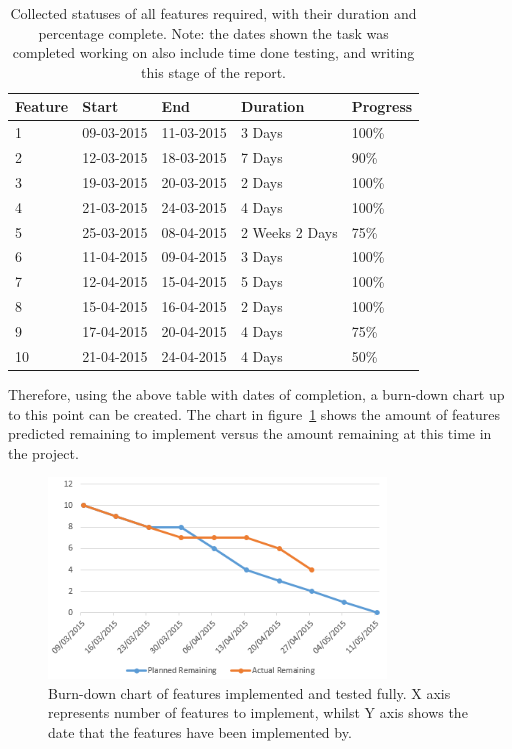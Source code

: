 \begin{table}[h]
\centering
\begin{tabular}{|l|l|l|l|l|}
\hline
\textbf{Feature} & \textbf{Start} & \textbf{End} & \textbf{Duration} & \textbf{Progress}                                                                                                \\ \hline
1 & 09-03-2015     & 11-03-2015   & 3 Days            & 100\%\\ \hline
2 & 12-03-2015     & 18-03-2015   & 7 Days            & 90\%\\ \hline
3 & 19-03-2015     & 20-03-2015   & 2 Days            & 100\% \\ \hline
4 & 21-03-2015     & 24-03-2015   & 4 Days            & 100\%\\ \hline
5 & 25-03-2015     & 08-04-2015   & 2 Weeks 2 Days    & 75\% \\ \hline
6 & 11-04-2015     & 09-04-2015   & 3 Days            & 100\% \\ \hline
7 & 12-04-2015     & 15-04-2015   & 5 Days            & 100\% \\ \hline
8 & 15-04-2015     & 16-04-2015   & 2 Days            & 100\% \\ \hline
9 & 17-04-2015     & 20-04-2015   & 4 Days            & 75\% \\ \hline
10 & 21-04-2015     & 24-04-2015   & 4 Days            & 50\% \\ \hline
\end{tabular}
\caption{Collected statuses of all features required, with their duration and percentage complete. Note: the dates shown the task was completed working on also include time done testing, and writing this stage of the report.}
\label{tbl:features}
\end{table}

Therefore, using the above table with dates of completion, a burn-down chart up to this point can be created. The chart in figure~\ref{fig:burndown} shows the amount of features predicted remaining to implement versus the amount remaining at this time in the project. 

\begin{figure}[h]
  \centering
      \includegraphics[width=0.8\textwidth]{images/burndown.png}
  \caption{Burn-down chart of features implemented and tested fully. X axis represents number of features to implement, whilst Y axis shows the date that the features have been implemented by.}
  \label{fig:burndown}
\end{figure}

